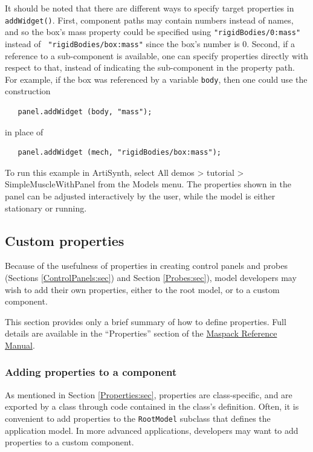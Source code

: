 \begin{sideblock}
It should be noted that there are different ways to specify target
properties in {\tt addWidget()}. First, component paths may contain
numbers instead of names, and so the box's mass property could be
specified using {\tt "rigidBodies/0:mass"} instead of {\tt
"rigidBodies/box:mass"} since the box's number is 0. Second, if a
reference to a sub-component is available, one can specify properties
directly with respect to that, instead of indicating the sub-component
in the property path. For example, if the box was referenced by a
variable {\tt body}, then one could use the construction
%
\begin{verbatim}
   panel.addWidget (body, "mass");
\end{verbatim}
%
in place of 
%
\begin{verbatim}
   panel.addWidget (mech, "rigidBodies/box:mass");
\end{verbatim}
%
\end{sideblock}

To run this example in ArtiSynth, select {\sf All demos > tutorial >
SimpleMuscleWithPanel} from the {\sf Models} menu. The properties 
shown in the panel can be adjusted interactively by the user,
while the model is either stationary or running.

\subsection{Custom properties}
\label{CustomProperties:sec}

Because of the usefulness of properties in creating control panels and
probes (Sections \ref{ControlPanels:sec}) and Section
\ref{Probes:sec}), model developers may wish to add their own
properties, either to the root model, or to a custom component.

This section provides only a brief summary of how to define
properties. Full details are available in the ``Properties'' section of
the \href{../maspack/maspack.html}{
Maspack Reference Manual}.

\subsubsection{Adding properties to a component}

As mentioned in Section \ref{Properties:sec}, properties are
class-specific, and are exported by a class through code contained in
the class's definition.  Often, it is convenient to add properties to
the {\tt RootModel} subclass that defines the application model. In
more advanced applications, developers may want to add properties to a
custom component.

